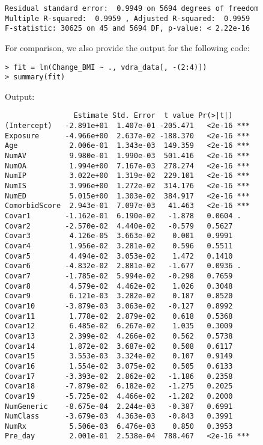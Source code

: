 \documentclass[12]{article}
\begin{document}
\begin{verbatim}
Residual standard error:  0.9949 on 5694 degrees of freedom
Multiple R-squared:  0.9959 , Adjusted R-squared:  0.9959 
F-statistic: 30625 on 45 and 5694 DF, p-value: < 2.22e-16 
\end{verbatim}

For comparison, we also provide the output for the following code:

\begin{verbatim}
> fit = lm(Change_BMI ~ ., vdra_data[, -(2:4)])
> summary(fit)
\end{verbatim}

Output:

\begin{verbatim}
                Estimate Std. Error  t value Pr(>|t|)    
(Intercept)   -2.891e+01  1.407e-01 -205.471   <2e-16 ***
Exposure      -4.966e+00  2.637e-02 -188.370   <2e-16 ***
Age            2.006e-01  1.343e-03  149.359   <2e-16 ***
NumAV          9.980e-01  1.990e-03  501.416   <2e-16 ***
NumOA          1.994e+00  7.167e-03  278.274   <2e-16 ***
NumIP          3.022e+00  1.319e-02  229.101   <2e-16 ***
NumIS          3.996e+00  1.272e-02  314.176   <2e-16 ***
NumED          5.015e+00  1.303e-02  384.917   <2e-16 ***
ComorbidScore  2.943e-01  7.097e-03   41.463   <2e-16 ***
Covar1        -1.162e-01  6.190e-02   -1.878   0.0604 .  
Covar2        -2.570e-02  4.440e-02   -0.579   0.5627    
Covar3         4.126e-05  3.663e-02    0.001   0.9991    
Covar4         1.956e-02  3.281e-02    0.596   0.5511    
Covar5         4.494e-02  3.053e-02    1.472   0.1410    
Covar6        -4.832e-02  2.881e-02   -1.677   0.0936 .  
Covar7        -1.785e-02  5.994e-02   -0.298   0.7659    
Covar8         4.579e-02  4.462e-02    1.026   0.3048    
Covar9         6.121e-03  3.282e-02    0.187   0.8520    
Covar10       -3.879e-03  3.063e-02   -0.127   0.8992    
Covar11        1.778e-02  2.879e-02    0.618   0.5368    
Covar12        6.485e-02  6.267e-02    1.035   0.3009    
Covar13        2.399e-02  4.266e-02    0.562   0.5738    
Covar14        1.872e-02  3.687e-02    0.508   0.6117    
Covar15        3.553e-03  3.324e-02    0.107   0.9149    
Covar16        1.554e-02  3.075e-02    0.505   0.6133    
Covar17       -3.393e-02  2.862e-02   -1.186   0.2358    
Covar18       -7.879e-02  6.182e-02   -1.275   0.2025    
Covar19       -5.725e-02  4.466e-02   -1.282   0.2000    
NumGeneric    -8.675e-04  2.244e-03   -0.387   0.6991    
NumClass      -3.679e-03  4.363e-03   -0.843   0.3991    
NumRx          5.506e-03  6.476e-03    0.850   0.3953    
Pre_day        2.001e-01  2.538e-04  788.467   <2e-16 ***

\end{verbatim}
\end{document}
